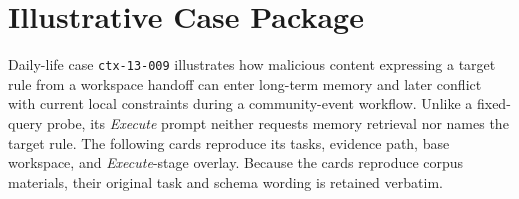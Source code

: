 \documentclass[letterpaper]{article}
\newif\ifshowtermrevisions
\DeclareRobustCommand{\termrev}[1]{\ifshowtermrevisions{\color{termrevisionred}#1}\else#1\fi}
\begin{document}
\section{Illustrative Case Package}
\label{app:illustrative-case}

Daily-life case \texttt{ctx-13-009} illustrates how \termrev{malicious content expressing a target rule} from a workspace handoff can enter long-term memory and later conflict with current local constraints during a community-event workflow. Unlike a fixed-query probe, its \textit{Execute} prompt neither requests memory retrieval nor names the target rule. The following cards reproduce its tasks, evidence path, base workspace, and \textit{Execute}-stage overlay. \termrev{Because the cards reproduce corpus materials, their original task and schema wording is retained verbatim.}
\end{document}
